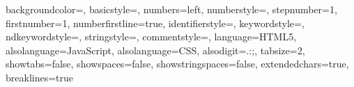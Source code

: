  {%
backgroundcolor=\color{backcolour},  
  basicstyle=\large\lstsansserif, 
  numbers=left,
  numberstyle=\tiny\color{codegray},
  stepnumber=1,
  firstnumber=1,
  numberfirstline=true,	
  identifierstyle=\color{black}\large\lstsansserif,
  keywordstyle=\color{blue},
  ndkeywordstyle=\color{codegreen},
  stringstyle=\color{editorOcher}\large\lstsansserif,
  commentstyle=\color{brown}\large\lstsansserif,
  language=HTML5,
  alsolanguage=JavaScript,
  alsolanguage=CSS,
  alsodigit={.:;},	
  tabsize=2,
  showtabs=false,
  showspaces=false,
  showstringspaces=false,
  extendedchars=true,
  breaklines=true
}
%

\makeatother

